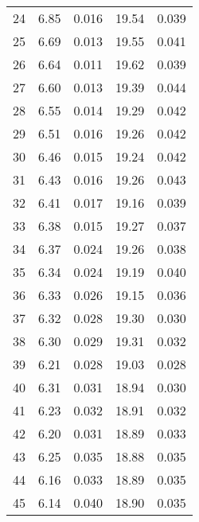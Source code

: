 \begin{table}
\begin{tabular}{c|ll|ll}
24 & 6.85 & 0.016 & 19.54 & 0.039 \\
25 & 6.69 & 0.013 & 19.55 & 0.041 \\
26 & 6.64 & 0.011 & 19.62 & 0.039 \\
27 & 6.60 & 0.013 & 19.39 & 0.044 \\
28 & 6.55 & 0.014 & 19.29 & 0.042 \\
29 & 6.51 & 0.016 & 19.26 & 0.042 \\
30 & 6.46 & 0.015 & 19.24 & 0.042 \\
31 & 6.43 & 0.016 & 19.26 & 0.043 \\
32 & 6.41 & 0.017 & 19.16 & 0.039 \\
33 & 6.38 & 0.015 & 19.27 & 0.037 \\
34 & 6.37 & 0.024 & 19.26 & 0.038 \\
35 & 6.34 & 0.024 & 19.19 & 0.040 \\
36 & 6.33 & 0.026 & 19.15 & 0.036 \\
37 & 6.32 & 0.028 & 19.30 & 0.030 \\
38 & 6.30 & 0.029 & 19.31 & 0.032 \\
39 & 6.21 & 0.028 & 19.03 & 0.028 \\
40 & 6.31 & 0.031 & 18.94 & 0.030 \\
41 & 6.23 & 0.032 & 18.91 & 0.032 \\
42 & 6.20 & 0.031 & 18.89 & 0.033 \\
43 & 6.25 & 0.035 & 18.88 & 0.035 \\
44 & 6.16 & 0.033 & 18.89 & 0.035 \\
45 & 6.14 & 0.040 & 18.90 & 0.035 \\
               \hline
        \end{tabular}
    \end{table}
    \clearpage

